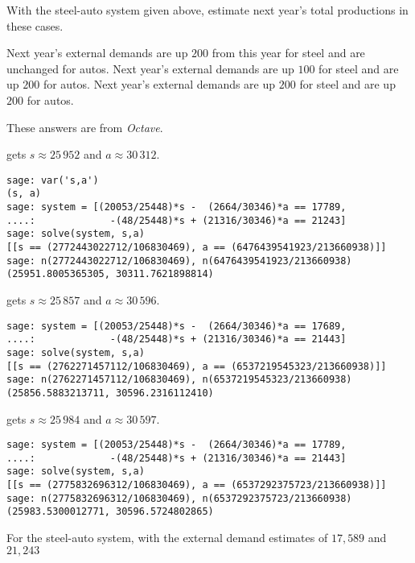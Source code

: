\begin{exercises}
  \item 
    With the steel-auto system given above, estimate next year's
    total productions in these cases.
    \begin{exparts}
      \partsitem Next year's external demands are up $200$ from this
         year for steel and are unchanged for autos.
      \partsitem Next year's external demands are up $100$ for steel and
         are up $200$ for autos.
      \partsitem Next year's external demands are up $200$ for steel and
         are up $200$ for autos.
    \end{exparts} 
    \begin{answer}
      These answers are from \textit{Octave}.
      \begin{exparts}
        \partsitem \Sage{} gets $s\approx 25\,952$ and $a\approx 30\,312$.
\begin{lstlisting}
sage: var('s,a')
(s, a)
sage: system = [(20053/25448)*s -  (2664/30346)*a == 17789,
....:             -(48/25448)*s + (21316/30346)*a == 21243]
sage: solve(system, s,a)
[[s == (2772443022712/106830469), a == (6476439541923/213660938)]]
sage: n(2772443022712/106830469), n(6476439541923/213660938)
(25951.8005365305, 30311.7621898814)          
\end{lstlisting}
        \partsitem \Sage{} gets $s\approx 25\,857$ and $a\approx 30\,596$.
\begin{lstlisting}
sage: system = [(20053/25448)*s -  (2664/30346)*a == 17689,
....:             -(48/25448)*s + (21316/30346)*a == 21443]
sage: solve(system, s,a)
[[s == (2762271457112/106830469), a == (6537219545323/213660938)]]
sage: n(2762271457112/106830469), n(6537219545323/213660938)
(25856.5883213711, 30596.2316112410)
\end{lstlisting}
        \partsitem \Sage{} gets $s\approx 25\,984$ and $a\approx 30\,597$.
\begin{lstlisting}
sage: system = [(20053/25448)*s -  (2664/30346)*a == 17789,
....:             -(48/25448)*s + (21316/30346)*a == 21443]
sage: solve(system, s,a)
[[s == (2775832696312/106830469), a == (6537292375723/213660938)]]
sage: n(2775832696312/106830469), n(6537292375723/213660938)
(25983.5300012771, 30596.5724802865)          
\end{lstlisting}
      \end{exparts}
    \end{answer}
  \item 
    For the steel-auto system,  
    with the external demand estimates of $17,589$ and $21,243$

\end{exercises}
